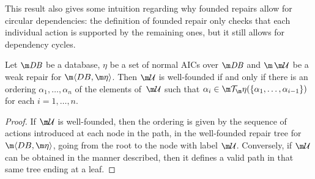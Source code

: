 This result also gives some intuition regarding why founded repairs allow for circular dependencies: the definition of founded repair only checks that each individual action is supported by the remaining ones, but it still allows for dependency cycles.

\begin{proposition}
  \label{prop:wf}
  Let $\db$ be a database, $\eta$ be a set of normal AICs over $\db$ and $\spaceUU$ be a weak repair for $\fulldb$.
  Then $\UU$ is well-founded if and only if there is an ordering $\alpha_1,\ldots,\alpha_n$ of the elements of\, $\UU$ such that $\alpha_i\in\Op(\{\alpha_1,\ldots,\alpha_{i-1}\})$ for each $i=1,\ldots,n$.
\end{proposition}
\begin{proof}
  If $\UU$ is well-founded, then the ordering is given by the sequence of actions introduced at each node in the path, in the well-founded repair tree for $\fulldb$, going from the root to the node with label $\UU$.
  Conversely, if $\UU$ can be obtained in the manner described, then it defines a valid path in that same tree ending at a leaf.
\end{proof}



